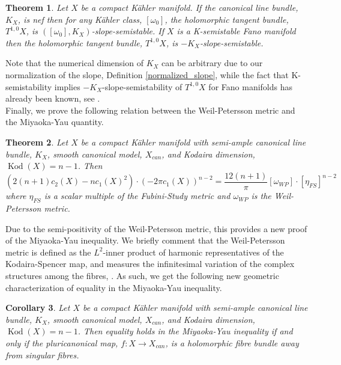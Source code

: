 \documentclass[12pt]{article}
\newtheorem{theorem}{Theorem}[section]
\newtheorem{corollary}[theorem]{Corollary}
\numberwithin{equation}{section}
\DeclareMathOperator{\Kod}{Kod}
\begin{document}
\begin{theorem}
Let $X$ be a compact K\"ahler manifold. If the canonical line bundle, $K_X$, is nef then for any K\"ahler class, $[\omega_0]$, the holomorphic tangent bundle, $T^{1,0} X$, is $([\omega_0],K_X)$-slope-semistable. If $X$ is a K-semistable Fano manifold then the holomorphic tangent bundle, $T^{1,0} X$, is $-K_X$-slope-semistable. 
\end{theorem}

\noindent Note that the numerical dimension of $K_X$ can be arbitrary due to our normalization of the slope, Definition \ref{normalized_slope}, while the fact that K-semistability implies $-K_X$-slope-semistability of $T^{1,0} X$ for Fano manifolds has already been known, see \cite{L21,H24}.\\

\noindent Finally, we prove the following relation between the Weil-Petersson metric and the Miyaoka-Yau quantity.


\begin{theorem}
Let $X$ be a compact K\"ahler manifold with semi-ample canonical line bundle, $K_X$, smooth canonical model, $X_{can}$, and Kodaira dimension, $\Kod(X) = n-1$. Then
\begin{equation*}
    (2(n+1) c_2(X) - n c_1(X)^2) \cdot (-2 \pi c_1(X))^{n-2} = \frac{12(n+1)}{\pi} [\omega_{WP}] \cdot [\eta_{FS}]^{n-2}
\end{equation*}
where $\eta_{FS}$ is a scalar multiple of the Fubini-Study metric and $\omega_{WP}$ is the Weil-Petersson metric.
\end{theorem}

\noindent Due to the semi-positivity of the Weil-Petersson metric, this provides a new proof of the Miyaoka-Yau inequality. We briefly comment that the Weil-Petersson metric is defined as the $L^2$-inner product of harmonic representatives of the Kodaira-Spencer map, and measures the infinitesimal variation of the complex structures among the fibres, \cite{T87, ST12,T19}. As such, we get the following new geometric characterization of equality in the Miyaoka-Yau inequality.

\begin{corollary}
Let $X$ be a compact K\"ahler manifold with semi-ample canonical line bundle, $K_X$, smooth canonical model, $X_{can}$, and Kodaira dimension, $\Kod(X) = n-1$. Then equality holds in the Miyaoka-Yau inequality if and only if the pluricanonical map, $f: X \to X_{can}$, is a holomorphic fibre bundle away from singular fibres.
\end{corollary}
\end{document}
